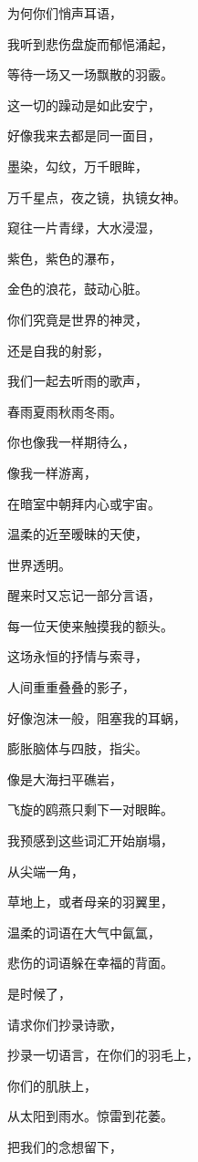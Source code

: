 \documentclass[UTF8]{article}
\begin{document}
\par 为何你们悄声耳语，
\par 我听到悲伤盘旋而郁悒涌起，
\par 等待一场又一场飘散的羽霰。
\par 这一切的躁动是如此安宁，
\par 好像我来去都是同一面目，
\par 墨染，勾纹，万千眼眸，
\par 万千星点，夜之镜，执镜女神。
\par 窥往一片青绿，大水浸湿，
\par 紫色，紫色的瀑布，
\par 金色的浪花，鼓动心脏。
\par 你们究竟是世界的神灵，
\par 还是自我的射影，
\par 我们一起去听雨的歌声，
\par 春雨夏雨秋雨冬雨。
\par 你也像我一样期待么，
\par 像我一样游离，
\par 在暗室中朝拜内心或宇宙。
\\[0.6cm]
\par 温柔的近至暧昧的天使，
\par 世界透明。
\par 醒来时又忘记一部分言语，
\par 每一位天使来触摸我的额头。
\par 这场永恒的抒情与索寻，
\par 人间重重叠叠的影子，
\par 好像泡沫一般，阻塞我的耳蜗，
\par 膨胀脑体与四肢，指尖。
\par 像是大海扫平礁岩，
\par 飞旋的鸥燕只剩下一对眼眸。
\par 我预感到这些词汇开始崩塌，
\par 从尖端一角，
\par 草地上，或者母亲的羽翼里，
\par 温柔的词语在大气中氤氲，
\par 悲伤的词语躲在幸福的背面。
\par 是时候了，
\par 请求你们抄录诗歌，
\par 抄录一切语言，在你们的羽毛上，
\par 你们的肌肤上，
\par 从太阳到雨水。惊雷到花萎。
\par 把我们的念想留下，
\end{document}
